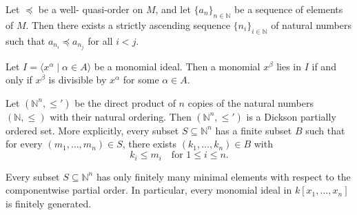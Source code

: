 \begin{proposition}\label{prop:wqoAscendingSubsequence} %
    Let $\preceq$ be a well- quasi-order on $M$, and let $\{a_n\}_{n \in \mathbb{N}}$ be a sequence of elements of $M$.
    Then there exists a strictly ascending sequence $\{n_i\}_{i \in \mathbb{N}}$ of natural numbers such that $a_{n_i} \preceq a_{n_j}$ for all $i < j$.
\end{proposition}

\begin{lemma}\label{lem:mem_monomialIdeal_iff_divisible} %
    Let $I = \langle x^\alpha \mid \alpha \in A \rangle$ be a monomial ideal.
    Then a monomial $x^\beta$ lies in $I$ if and only if $x^\beta$ is divisible by $x^\alpha$ for some $\alpha \in A$.
\end{lemma}

\begin{theorem}\label{thm:Dickson} %
    Let $(\mathbb{N}^n, \le')$ be the direct product of $n$ copies of the natural numbers $(\mathbb{N}, \le)$ with their natural ordering. 
    Then $(\mathbb{N}^n, \le')$ is a Dickson partially ordered set. 
    More explicitly, every subset $S \subseteq \mathbb{N}^n$ has a finite subset $B$ such that for every $(m_1, \dots, m_n) \in S$, there exists $(k_1, \dots, k_n) \in B$ with
    \[
    k_i \le m_i \quad \text{for } 1 \le i \le n.
    \]
\end{theorem}

\begin{theorem}\label{thm:Dickson'}
    Every subset $S\subseteq \mathbb{N}^n$ has only finitely many minimal elements with respect to the componentwise partial order. 
    In particular, every monomial ideal in $k[x_1,\dots,x_n]$ is finitely generated.
\end{theorem}